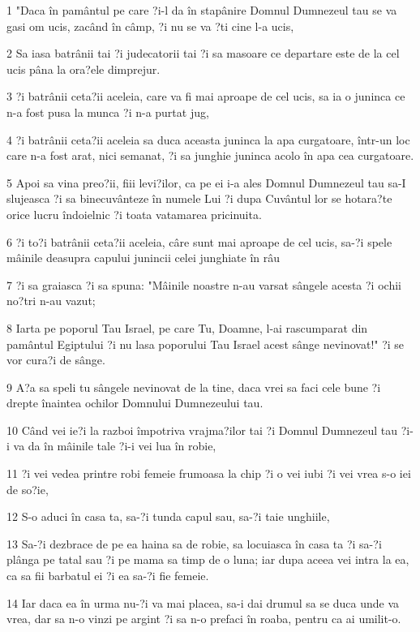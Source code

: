 \par 1 "Daca în pamântul pe care ?i-l da în stapânire Domnul Dumnezeul tau se va gasi om ucis, zacând în câmp, ?i nu se va ?ti cine l-a ucis,
\par 2 Sa iasa batrânii tai ?i judecatorii tai ?i sa masoare ce departare este de la cel ucis pâna la ora?ele dimprejur.
\par 3 ?i batrânii ceta?ii aceleia, care va fi mai aproape de cel ucis, sa ia o juninca ce n-a fost pusa la munca ?i n-a purtat jug,
\par 4 ?i batrânii ceta?ii aceleia sa duca aceasta juninca la apa curgatoare, într-un loc care n-a fost arat, nici semanat, ?i sa junghie juninca acolo în apa cea curgatoare.
\par 5 Apoi sa vina preo?ii, fiii levi?ilor, ca pe ei i-a ales Domnul Dumnezeul tau sa-I slujeasca ?i sa binecuvânteze în numele Lui ?i dupa Cuvântul lor se hotara?te orice lucru îndoielnic ?i toata vatamarea pricinuita.
\par 6 ?i to?i batrânii ceta?ii aceleia, câre sunt mai aproape de cel ucis, sa-?i spele mâinile deasupra capului junincii celei junghiate în râu
\par 7 ?i sa graiasca ?i sa spuna: "Mâinile noastre n-au varsat sângele acesta ?i ochii no?tri n-au vazut;
\par 8 Iarta pe poporul Tau Israel, pe care Tu, Doamne, l-ai rascumparat din pamântul Egiptului ?i nu lasa poporului Tau Israel acest sânge nevinovat!" ?i se vor cura?i de sânge.
\par 9 A?a sa speli tu sângele nevinovat de la tine, daca vrei sa faci cele bune ?i drepte înaintea ochilor Domnului Dumnezeului tau.
\par 10 Când vei ie?i la razboi împotriva vrajma?ilor tai ?i Domnul Dumnezeul tau ?i-i va da în mâinile tale ?i-i vei lua în robie,
\par 11 ?i vei vedea printre robi femeie frumoasa la chip ?i o vei iubi ?i vei vrea s-o iei de so?ie,
\par 12 S-o aduci în casa ta, sa-?i tunda capul sau, sa-?i taie unghiile,
\par 13 Sa-?i dezbrace de pe ea haina sa de robie, sa locuiasca în casa ta ?i sa-?i plânga pe tatal sau ?i pe mama sa timp de o luna; iar dupa aceea vei intra la ea, ca sa fii barbatul ei ?i ea sa-?i fie femeie.
\par 14 Iar daca ea în urma nu-?i va mai placea, sa-i dai drumul sa se duca unde va vrea, dar sa n-o vinzi pe argint ?i sa n-o prefaci în roaba, pentru ca ai umilit-o.
